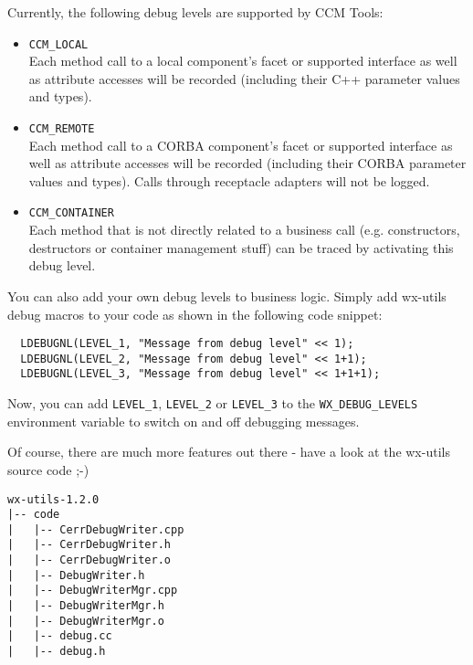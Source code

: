 Currently, the following debug levels are supported by CCM Tools:
\begin{itemize}
\item {\tt CCM\_LOCAL} \\
Each method call to a local component's facet or supported interface
as well as attribute accesses will be recorded (including their C++ parameter
values and types).

\item {\tt CCM\_REMOTE} \\
Each method call to a CORBA component's facet or supported interface
as well as attribute accesses will be recorded (including their CORBA 
parameter values and types). Calls through receptacle adapters will not
be logged.

\item {\tt CCM\_CONTAINER} \\
Each method that is not directly related to a business call (e.g. constructors,
destructors or container management stuff) can be traced by activating this 
debug level.
\end{itemize}

You can also add your own debug levels to business logic. Simply add
wx-utils debug macros to your code as shown in the following code snippet:
\begin{verbatim}
  LDEBUGNL(LEVEL_1, "Message from debug level" << 1);
  LDEBUGNL(LEVEL_2, "Message from debug level" << 1+1);
  LDEBUGNL(LEVEL_3, "Message from debug level" << 1+1+1);
\end{verbatim}
Now, you can add {\tt LEVEL\_1}, {\tt LEVEL\_2} or {\tt LEVEL\_3} to the 
{\tt WX\_DEBUG\_LEVELS} environment variable to switch on and off debugging
messages.

Of course, there are much more features out there - have a look at the wx-utils
source code ;-)
\begin{verbatim}
wx-utils-1.2.0
|-- code
|   |-- CerrDebugWriter.cpp
|   |-- CerrDebugWriter.h
|   |-- CerrDebugWriter.o
|   |-- DebugWriter.h
|   |-- DebugWriterMgr.cpp
|   |-- DebugWriterMgr.h
|   |-- DebugWriterMgr.o
|   |-- debug.cc
|   |-- debug.h
\end{verbatim}